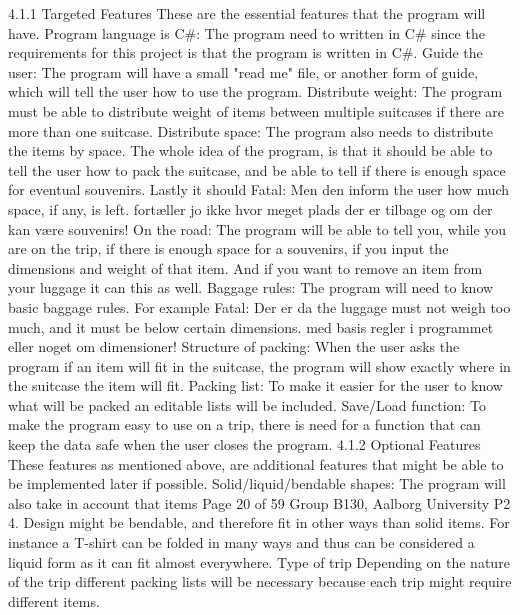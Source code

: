 4.1.1 Targeted Features
These are the essential features that the program will have.
Program language is C#: The program need to written in C# since the requirements
for this project is that the program is written in C#.
Guide the user: The program will have a small "read me" file, or another form of
guide, which will tell the user how to use the program.
Distribute weight: The program must be able to distribute weight of items between
multiple suitcases if there are more than one suitcase.
Distribute space: The program also needs to distribute the items by space. The
whole idea of the program, is that it should be able to tell the user how to pack the suitcase,
and be able to tell if there is enough space for eventual souvenirs. Lastly it should
Fatal: Men den inform the user how much space, if any, is left.
fortæller jo ikke hvor
meget plads der er
tilbage og om der kan
være souvenirs!
On the road: The program will be able to tell you, while you are on the trip, if there
is enough space for a souvenirs, if you input the dimensions and weight of that item. And
if you want to remove an item from your luggage it can this as well.
Baggage rules: The program will need to know basic baggage rules. For example
Fatal: Der er da the luggage must not weigh too much, and it must be below certain dimensions.
med basis regler i
programmet eller noget
om dimensioner! Structure of packing: When the user asks the program if an item will fit in the
suitcase, the program will show exactly where in the suitcase the item will fit.
Packing list: To make it easier for the user to know what will be packed an editable
lists will be included.
Save/Load function: To make the program easy to use on a trip, there is need for
a function that can keep the data safe when the user closes the program.
4.1.2 Optional Features
These features as mentioned above, are additional features that might be able to be implemented
later if possible.
Solid/liquid/bendable shapes: The program will also take in account that items
Page 20 of 59
Group B130, Aalborg University P2 4. Design
might be bendable, and therefore fit in other ways than solid items. For instance a T-shirt
can be folded in many ways and thus can be considered a liquid form as it can fit almost
everywhere.
Type of trip Depending on the nature of the trip different packing lists will be necessary
because each trip might require different items.